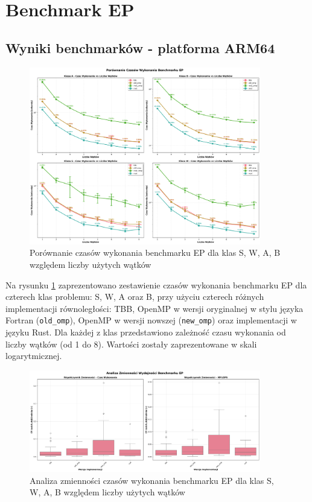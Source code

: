 
\section{Benchmark EP}
\subsection{Wyniki benchmarków - platforma ARM64}
\begin{figure}[H]
    \centering
    \includegraphics[width=0.9\textwidth]{analiza/images/parallel/ep/arm/ep_porownanie_czasow_wykonania.png}
    \caption{Porównanie czasów wykonania benchmarku EP dla klas S, W, A, B względem liczby użytych wątków}
    \label{ep_porownanie_czasow_wykonania}
\end{figure}

Na rysunku \ref{ep_porownanie_czasow_wykonania} zaprezentowano zestawienie czasów wykonania benchmarku EP dla czterech klas problemu: S, W, A oraz B, przy użyciu czterech różnych implementacji równoległości: TBB, OpenMP w wersji oryginalnej w stylu języka Fortran (\texttt{old\_omp}), OpenMP w wersji nowszej (\texttt{new\_omp}) oraz implementacji w języku Rust. Dla każdej z klas przedstawiono zależność czasu wykonania od liczby wątków (od 1 do 8). Wartości zostały zaprezentowane w skali logarytmicznej.

\begin{figure}[H]
    \centering
    \includegraphics[width=0.9\textwidth]{analiza/images/parallel/ep/arm/ep_analiza_zmiennosci.png}
    \caption{Analiza zmienności czasów wykonania benchmarku EP dla klas S, W, A, B względem liczby użytych wątków}
    \label{ep_analiza_zmiennosci}
\end{figure}

